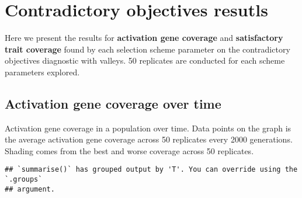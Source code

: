 \documentclass[]{book}
\newenvironment{Shaded}{\begin{snugshade}}{\end{snugshade}}
\newcommand{\DataTypeTok}[1]{\textcolor[rgb]{0.13,0.29,0.53}{#1}}
\newcommand{\KeywordTok}[1]{\textcolor[rgb]{0.13,0.29,0.53}{\textbf{#1}}}
\newcommand{\NormalTok}[1]{#1}
\newcommand{\OperatorTok}[1]{\textcolor[rgb]{0.81,0.36,0.00}{\textbf{#1}}}
\newcommand{\StringTok}[1]{\textcolor[rgb]{0.31,0.60,0.02}{#1}}
\begin{document}
\hypertarget{contradictory-objectives-resutls-1}{%
\section{Contradictory objectives resutls}\label{contradictory-objectives-resutls-1}}

Here we present the results for \textbf{activation gene coverage} and \textbf{satisfactory trait coverage} found by each selection scheme parameter on the contradictory objectives diagnostic with valleys.
50 replicates are conducted for each scheme parameters explored.

\hypertarget{activation-gene-coverage-over-time-2}{%
\subsection{Activation gene coverage over time}\label{activation-gene-coverage-over-time-2}}

Activation gene coverage in a population over time.
Data points on the graph is the average activation gene coverage across 50 replicates every 2000 generations.
Shading comes from the best and worse coverage across 50 replicates.

\begin{Shaded}
\end{Shaded}

\begin{verbatim}
## `summarise()` has grouped output by 'T'. You can override using the `.groups`
## argument.
\end{verbatim}
\end{document}
